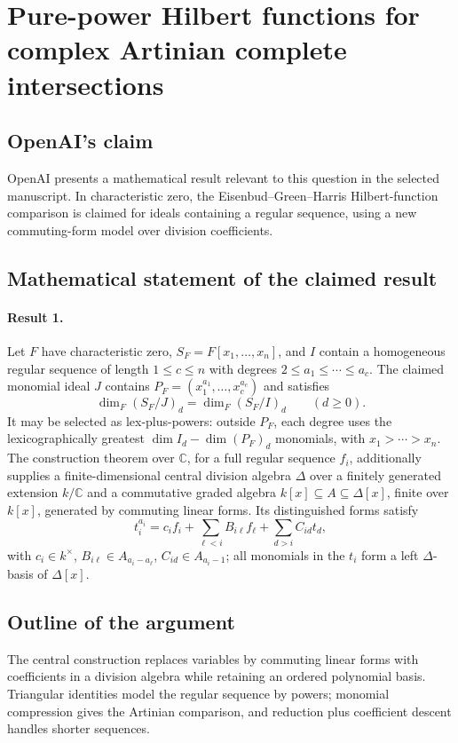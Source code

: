 \documentclass[11pt]{article}
\begin{document}
\section*{Pure-power Hilbert functions for complex Artinian complete intersections}

\subsection{OpenAI's claim}
OpenAI presents a mathematical result relevant to this question in the selected manuscript. In characteristic zero, the Eisenbud--Green--Harris Hilbert-function comparison is claimed for ideals containing a regular sequence, using a new commuting-form model over division coefficients.

\subsection{Mathematical statement of the claimed result}
\paragraph{Result 1.} Let \(F\) have characteristic zero, \(S_F=F[x_1,\ldots,x_n]\), and \(I\) contain a homogeneous regular sequence of length \(1\le c\le n\) with degrees \(2\le a_1\le\cdots\le a_c\). The claimed monomial ideal \(J\) contains \(P_F=(x_1^{a_1},\ldots,x_c^{a_c})\) and satisfies
\[
 \dim_F(S_F/J)_d=\dim_F(S_F/I)_d\qquad(d\ge0).
\]
It may be selected as lex-plus-powers: outside \(P_F\), each degree uses the lexicographically greatest \(\dim I_d-\dim(P_F)_d\) monomials, with \(x_1>\cdots>x_n\). The construction theorem over \(\mathbb C\), for a full regular sequence \(f_i\), additionally supplies a finite-dimensional central division algebra \(\Delta\) over a finitely generated extension \(k/\mathbb C\) and a commutative graded algebra \(k[x]\subseteq A\subseteq\Delta[x]\), finite over \(k[x]\), generated by commuting linear forms. Its distinguished forms satisfy
\[
 t_i^{a_i}=c_if_i+\sum_{\ell<i}B_{i\ell}f_\ell+\sum_{d>i}C_{id}t_d,
\]
with \(c_i\in k^\times\), \(B_{i\ell}\in A_{a_i-a_\ell}\), \(C_{id}\in A_{a_i-1}\); all monomials in the \(t_i\) form a left \(\Delta\)-basis of \(\Delta[x]\).

\subsection{Outline of the argument}
The central construction replaces variables by commuting linear forms with coefficients in a division algebra while retaining an ordered polynomial basis. Triangular identities model the regular sequence by powers; monomial compression gives the Artinian comparison, and reduction plus coefficient descent handles shorter sequences.
\end{document}
